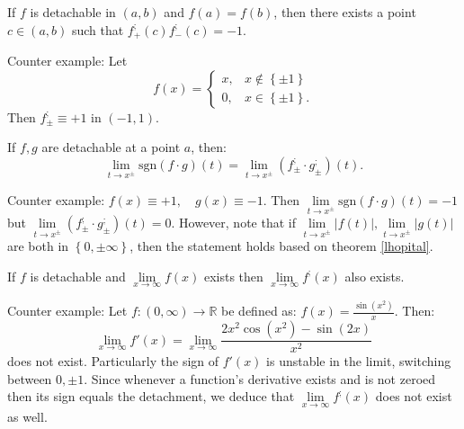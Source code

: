 \documentclass[11pt]{book}
\begin{document}
\begin{exercise}If $f$ is detachable in $\left(a,b\right)$ and $f\left(a\right)=f\left(b\right)$,
then there exists a point $c\in\left(a,b\right)$ such that $f_{+}^{;}\left(c\right)f_{-}^{;}\left(c\right)=-1$.
\end{exercise}

Counter example: Let
\[
f\left(x\right)=\begin{cases}
x, & x\notin\left\{ \pm1\right\} \\
0, & x\in\left\{ \pm1\right\} .
\end{cases}
\]
Then $f_{\pm}^{;}\equiv+1$ in $\left(-1,1\right)$.


\begin{exercise}If $f,g$ are detachable at a point $a$, then:
\[
\underset{t\rightarrow x^{\pm}}{\lim}\text{sgn}\left(f\cdot g\right)\left(t\right)=\underset{t\rightarrow x^{\pm}}{\lim}\left(f_{\pm}^{;}\cdot g_{\pm}^{;}\right)\left(t\right).
\]
\end{exercise}

Counter example: $f\left(x\right)\equiv+1,\quad g\left(x\right)\equiv-1$.
Then $\underset{t\rightarrow x^{\pm}}{\lim}\text{sgn}\left(f\cdot g\right)\left(t\right)=-1$
but $\underset{t\rightarrow x^{\pm}}{\lim}\left(f_{\pm}^{;}\cdot g_{\pm}^{;}\right)\left(t\right)=0$.
However, note that if $\underset{t\rightarrow x^{\pm}}{\lim}\left|f\left(t\right)\right|,\underset{t\rightarrow x^{\pm}}{\lim}\left|g\left(t\right)\right|$
are both in $\left\{ 0,\pm\infty\right\} $, then the statement holds
based on theorem \ref{lhopital}.

\begin{exercise}\label{ex_21}If $f$ is detachable and $\underset{x\rightarrow\infty}{\lim}f\left(x\right)$
exists then $\underset{x\rightarrow\infty}{\lim}f^{;}\left(x\right)$
also exists.
\end{exercise}

Counter example: Let $f:\left(0,\infty\right)\rightarrow\mathbb{R}$
be defined as: $f\left(x\right)=\frac{\sin\left(x^{2}\right)}{x}$.
Then:
\[
\underset{x\rightarrow\infty}{\lim}f'\left(x\right)=\underset{x\rightarrow\infty}{\lim}\frac{2x^{2}\cos\left(x^{2}\right)-\sin\left(2x\right)}{x^{2}}
\]
does not exist. Particularly the sign of $f'\left(x\right)$ is unstable
in the limit, switching between $0,\pm1$. Since whenever a function's
derivative exists and is not zeroed then its sign equals the detachment,
we deduce that $\underset{x\rightarrow\infty}{\lim}f^{;}\left(x\right)$
does not exist as well.
\end{document}
